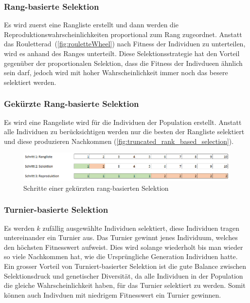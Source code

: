       \subsubsection{Rang-basierte Selektion}

        Es wird zuerst eine Rangliste erstellt und dann werden die Reproduktionswahrscheinlichkeiten proportional zum Rang zugeordnet.
        Anstatt das Rouletterad~(\vref{fig:rouletteWheel}) nach Fitness der Individuen zu unterteilen, wird es anhand des Ranges unterteilt.
        Diese Selektionsstrategie hat den Vorteil gegenüber der proportionalen Selektion,
        dass die Fitness der Indivdueen ähnlich sein darf, jedoch wird mit hoher Wahrscheinlichkeit immer noch das besere selektiert werden.

      \subsubsection{Gekürzte Rang-basierte Selektion}

        Es wird eine Rangeliste wird für die Individuen der Population erstellt.
        Anstatt alle Individuen zu berücksichtigen werden nur die besten der Rangliste selektiert und diese produzieren Nachkommen (\vref{fig:truncated_rank_based_selection}).

        \begin{figure}[H]
          \includegraphics[scale=0.7, center]{graphics/truncated_rank_based_selection}
          \caption{Schritte einer gekürzten rang-basierten Selektion\label{fig:truncated_rank_based_selection}}
        \end{figure}

      \subsubsection{Turnier-basierte Selektion\label{par:Turnier}}

        Es werden \(k\) zufällig ausgewählte Individuen selektiert, diese Individuen tragen untereinander ein Turnier aus.
        Das Turnier gewinnt jenes Individuum, welches den höchsten Fitnesswert aufweist.
        Dies wird solange wiederholt bis man wieder so viele Nachkommen hat,
        wie die Ursprüngliche Generation Individuen hatte.
        Ein grosser Vorteil von Turniert-basierter Selektion ist die gute Balance zwischen
        Selektionsdruck und genetischer Diversität, da alle Individuen in der Population die gleiche Wahrscheinlichkeit haben, für das Turnier selektiert zu werden.
        Somit können auch Indivduen mit niedrigem Fitnesswert ein Turnier gewinnen.

